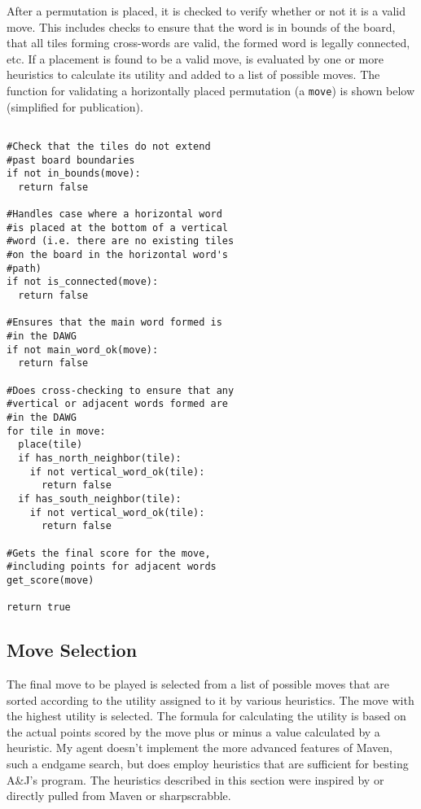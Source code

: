 \documentclass[letterpaper]{article}
\begin{document}
After a permutation is placed, it is checked to verify whether or not it is a valid move. This includes checks to ensure that the word is in bounds of the board, that all tiles forming cross-words are valid, the formed word is legally connected, etc. If a placement is found to be a valid move, is evaluated by one or more heuristics to calculate its utility and added to a list of possible moves. The function for validating a horizontally placed permutation (a \texttt{move}) is shown below (simplified for publication). 

\lstset{language=Python}
\begin{lstlisting}[frame=single, breaklines=true]  % Start your code-block

#Check that the tiles do not extend
#past board boundaries
if not in_bounds(move):
  return false
  
#Handles case where a horizontal word
#is placed at the bottom of a vertical
#word (i.e. there are no existing tiles
#on the board in the horizontal word's
#path)
if not is_connected(move):
  return false

#Ensures that the main word formed is
#in the DAWG
if not main_word_ok(move):
  return false

#Does cross-checking to ensure that any
#vertical or adjacent words formed are
#in the DAWG
for tile in move:
  place(tile)
  if has_north_neighbor(tile):
    if not vertical_word_ok(tile):
      return false
  if has_south_neighbor(tile):
    if not vertical_word_ok(tile):
      return false

#Gets the final score for the move,
#including points for adjacent words   
get_score(move)

return true
\end{lstlisting}

\subsection{Move Selection}
The final move to be played is selected from a list of possible moves that are sorted according to the utility assigned to it by various heuristics. The move with the highest utility is selected. The formula for calculating the utility is based on the actual points scored by the move plus or minus a value calculated by a heuristic. My agent doesn't implement the more advanced features of Maven, such a endgame search, but does employ heuristics that are sufficient for besting A\&J's program. The heuristics described in this section were inspired by or directly  pulled from Maven or sharpscrabble.
\end{document}
